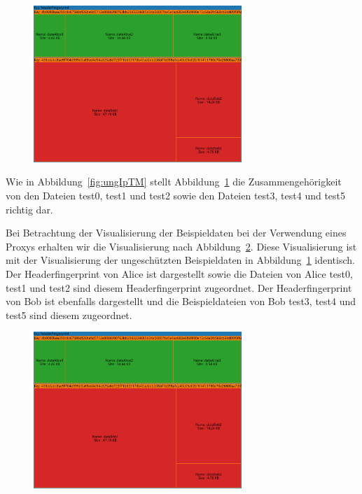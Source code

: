 \documentclass[
    fontsize=12pt,
    headings=small,
    parskip=half,           %
    bibliography=totoc,
    numbers=noenddot,       %
    open=any,               %
    ]{scrreprt}
\begin{document}
\begin{figure}[H]
\includegraphics[width=0.7\textwidth]{../pic/Header-Proxy-SetA.PNG}
\label{fig:ungHTM}
\end{figure}

Wie in Abbildung~\ref{fig:ungIpTM} stellt Abbildung~\ref{fig:ungHTM} die Zusammengehörigkeit von den Dateien test0, test1 und test2 sowie den Dateien test3, test4 und test5 richtig dar.

Bei Betrachtung der Visualisierung der Beispieldaten bei der Verwendung eines Proxys erhalten wir die Visualisierung nach Abbildung~\ref{fig:PHTM}.
Diese Visualisierung ist mit der Visualisierung der ungeschützten Beispieldaten in Abbildung~\ref{fig:ungHTM} identisch. 
Der Headerfingerprint von Alice ist dargestellt sowie die Dateien von Alice test0, test1 und test2 sind diesem Headerfingerprint zugeordnet.
Der Headerfingerprint von Bob ist ebenfalls dargestellt und die Beispieldateien von Bob test3, test4 und test5 sind diesem zugeordnet.

\begin{figure}[H]
\includegraphics[width=0.7\textwidth]{../pic/Header-Proxy-SetA.PNG}
\label{fig:PHTM}
\end{figure}
\end{document}
